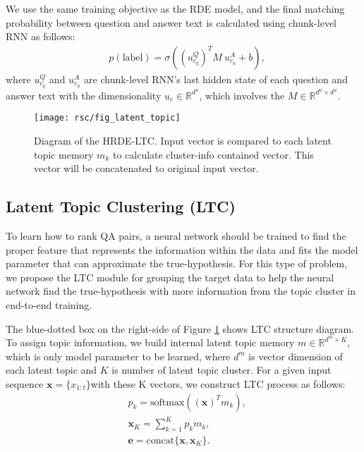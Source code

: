 \documentclass[11pt,a4paper]{article}
\begin{document}
We use the same training objective as the RDE model, and the final matching probability between question and answer text is calculated using  chunk-level RNN as follows:
\begin{equation}
\begin{aligned}
& p(\mbox{label}) = \sigma ( ({u_{c_q}^Q})^T M~u_{c_a}^A + b ),
\end{aligned}
\label{eq_hrde_loss}
\end{equation}
where $u_{c_q}^Q$ and $u_{c_a}^A$ are chunk-level RNN's last hidden state of each question and answer text with the dimensionality $u_c \in \mathbb{R}^{d^{u}}$, which involves the $M \in \mathbb{R}^{d^{u} \times d^{u}}$.


\begin{figure}[t]
\centering
\texttt{[image: rsc/fig\_latent\_topic]}
\caption{
Diagram of the HRDE-LTC.
Input vector is compared to each latent topic memory $m_k$ to calculate cluster-info contained vector. This vector will be concatenated to original input vector.
}
\label{fig_latent_topic}
\end{figure} 

\subsection{Latent Topic Clustering (LTC)}
To learn how to rank QA pairs, a neural network should be trained to find the proper feature that represents the information within the data and fits the model parameter that can approximate the true-hypothesis. For this type of problem, we propose the LTC module for grouping the target data to help the neural network find the true-hypothesis with more information from the topic cluster in end-to-end training. 

The blue-dotted box on the right-side of Figure \ref{fig_latent_topic} shows LTC structure diagram. To assign topic information, we build internal latent topic memory $m \in \mathbb{R}^{d^{m} \times K}$, which is only model parameter to be learned, where $d^{m}$ is vector dimension of each latent topic and $K$ is number of latent topic cluster.
For a given input sequence  $\boldsymbol{x}={\{x_{1:t}\}}$with these K vectors, we construct LTC process as follows:
\begin{equation}
\begin{aligned}
& p_k = \text{softmax}(( \boldsymbol{x})^Tm_k), \\
& \boldsymbol{x}_K = \sum_{k=1}^{K} p_km_k, \\
& \boldsymbol{e} = \text{concat}\{\boldsymbol{x},\boldsymbol{x}_K\}.
\end{aligned}
\label{eq_ltc_02}
\end{equation}
\end{document}
